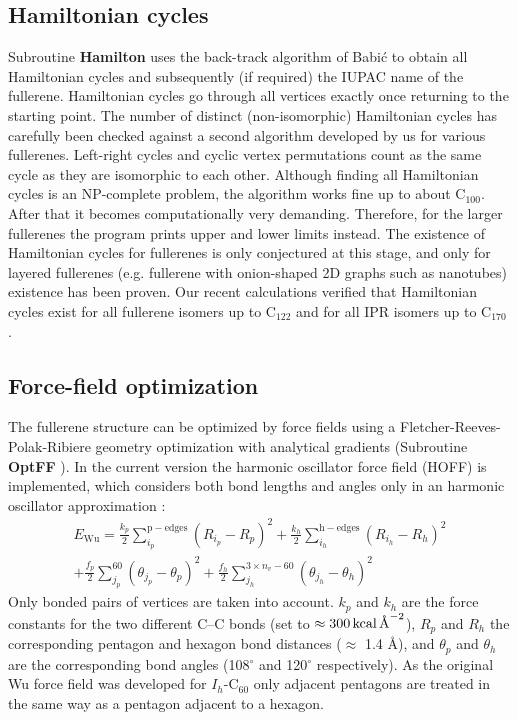 \documentclass[article,a4paper,twoside]{memoir}
\newcommand{\C}[1]{\ensuremath{\mathrm{C}_{#1}}}
\newcommand{\funname}[1]{{\color{blue}\textbf{#1}}}
\begin{document}
\subsection{Hamiltonian cycles}
Subroutine \funname{Hamilton} uses the back-track algorithm of Babi\'c \cite{Babic1995a} to obtain all 
Hamiltonian cycles and subsequently (if required) the IUPAC name of the fullerene. Hamiltonian cycles go through all vertices exactly once returning 
to the starting point. The number of distinct (non-isomorphic) Hamiltonian cycles has carefully been checked 
against a second algorithm developed by us for various fullerenes. Left-right cycles and cyclic vertex permutations count as the 
same cycle as they are isomorphic to each other. Although finding all Hamiltonian cycles is an NP-complete problem, the algorithm works fine up to about \C{100}. 
After that it becomes computationally very demanding. Therefore, for the larger fullerenes the program prints upper and lower limits instead. The existence of Hamiltonian cycles for fullerenes is only conjectured at this stage, and only for layered fullerenes 
(e.g. fullerene with onion-shaped 2D graphs such as nanotubes) existence has been proven. Our recent calculations verified that
Hamiltonian cycles exist for all fullerene isomers up to \C{122} and for all IPR isomers up to \C{170} \cite{PSAJDB}.

\subsection{Force-field optimization}
The fullerene structure can be optimized by force fields using a Fletcher-Reeves-Polak-Ribiere geometry optimization \cite{NumRec}
with analytical gradients (Subroutine \funname{OptFF} \cite{NumericalRecipes}). In the current version the harmonic oscillator
force field (HOFF) is implemented, which considers both bond lengths and angles only in an harmonic oscillator approximation \cite{Wu87}: 
\begin{multline}
  \label{eq:Ewu}
  E_{\mathrm{Wu}} = 
          \frac{k_p}{2} \sum_{i_p}^{\mathrm{p-edges}} \left(R_{i_p} - R_p\right)^2 
        + \frac{k_h}{2} \sum_{i_h}^{\mathrm{h-edges}} \left(R_{i_h} - R_h\right)^2 \\
        + \frac{f_p}{2} \sum_{j_p}^{60} \left(\theta_{j_p} - \theta_p\right)^2 
        + \frac{f_h}{2} \sum_{j_h}^{3\times n_v-60} \left(\theta_{j_h} - \theta_h\right)^2 
\end{multline}
Only bonded pairs of vertices are taken into account. $k_{p}$ and $k_{h}$ are
the force constants for the two different C--C bonds (set to $\approx 300 \text{\,kcal\,\AA}^{-2}$), $R_p$ and $R_h$ the corresponding pentagon and
hexagon bond distances ($\approx$ 1.4 \AA), and $\theta_p $ and $\theta_h$ are the corresponding bond angles (108$^\circ$ and 120$^\circ$
respectively). As the original Wu force field was developed for $I_h$-\C{60} only adjacent pentagons are treated in the same way as a pentagon adjacent to a hexagon.
\end{document}
